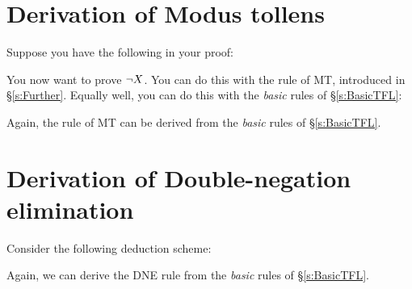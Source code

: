 \section{Derivation of Modus tollens}
Suppose you have the following in your proof:
\begin{pf}
\end{pf}
You now want
to prove $\neg X$. You can do this with the rule of MT, introduced in \S\ref{s:Further}. Equally well, you can do this with the \emph{basic} rules of \S\ref{s:BasicTFL}:
\begin{pf}
		\open
		\close
{}
\end{pf}
Again, the rule of MT can be derived from the \emph{basic} rules of \S\ref{s:BasicTFL}.



\section{Derivation of Double-negation elimination}
Consider the following deduction scheme:
	\begin{pf}
	\LEM
	\open
	\close
{}
	\open
	\close
{}	
\end{pf}
Again,  we can derive the DNE rule from the \emph{basic} rules of \S\ref{s:BasicTFL}.




%
\newpage
